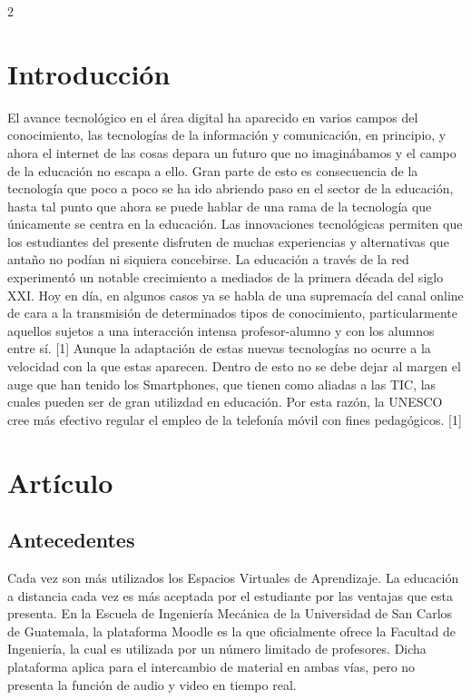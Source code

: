 \documentclass[11pt,spanish,Letterpaper,openany]{book}
\begin{document}
\begin {multicols}{2}

\hypertarget{introduccion-5}{%
\section{Introducción}\label{introduccion-5}}

El avance tecnológico en el área digital ha aparecido en varios campos del conocimiento, las tecnologías de la información y comunicación, en principio, y ahora el internet de las cosas depara un futuro que no imaginábamos y el campo de la educación no escapa a ello. Gran parte de esto es consecuencia de la tecnología que poco a poco se ha ido abriendo paso en el sector de la educación, hasta tal punto que ahora se puede hablar de una rama de la tecnología que únicamente se centra en la educación. Las innovaciones tecnológicas permiten que los estudiantes del presente disfruten de muchas experiencias y alternativas que antaño no podían ni siquiera concebirse. La educación a través de la red experimentó un notable crecimiento a mediados de la primera década del siglo XXI. Hoy en día, en algunos casos ya se habla de una supremacía del canal online de cara a la transmisión de determinados tipos de conocimiento, particularmente aquellos sujetos a una interacción intensa profesor-alumno y con los alumnos entre sí. {[}1{]} Aunque la adaptación de estas nuevas tecnologías no ocurre a la velocidad con la que estas aparecen. Dentro de esto no se debe dejar al margen el auge que han tenido los Smartphones, que tienen como aliadas a las TIC, las cuales pueden ser de gran utilizdad en educación. Por esta razón, la UNESCO cree más efectivo regular el empleo de la telefonía móvil con fines pedagógicos. {[}1{]}

\hypertarget{articulo-4}{%
\section{Artículo}\label{articulo-4}}

\hypertarget{antecedentes}{%
\subsection{Antecedentes}\label{antecedentes}}

Cada vez son más utilizados los Espacios Virtuales de Aprendizaje. La educación a distancia cada vez es más aceptada por el estudiante por las ventajas que esta presenta. En la Escuela de Ingeniería Mecánica de la Universidad de San Carlos de Guatemala, la plataforma Moodle es la que oficialmente ofrece la Facultad de Ingeniería, la cual es utilizada por un número limitado de profesores. Dicha plataforma aplica para el intercambio de material en ambas vías, pero no presenta la función de audio y video en tiempo real.


\end{multicols}
\end{document}

